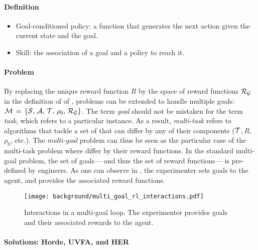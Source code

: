 \begin{tcolorbox}
\small
\paragraph{Definition}
\begin{itemize}
    \item \gls{Goal-conditioned policy}: a function that generates the next action given the current
state and the goal.
	\item \gls{Skill}:  the association of a goal and a policy to reach it.
\end{itemize}
\end{tcolorbox}

\paragraph{Problem}

By replacing the unique reward function $R$ by the space of reward functions $\mathcal{R}_{\mathcal{G}}$ in the definition of \mdp of , \rl problems can be extended to handle multiple goals: $\mathcal{M}\,=\,\{\mathcal{S},\,\mathcal{A},\,\mathcal{T},\,\rho_0,\,\mathcal{R}_{\mathcal{G}}\}$. The term \textit{goal} should not be mistaken for the term \textit{task}, which refers to a particular \mdp instance. As a result, \textit{multi-task} \rl refers to \rl algorithms that tackle a set of \mdps that can differ by any of their components (\eg $\mathcal{T}$,\,$R$,\,$\rho_0$, etc.). The \textit{multi-goal} \rl problem can thus be seen as the particular case of the multi-task \rl problem where \mdps differ by their reward functions. In the standard multi-goal \rl problem, the set of goals\,---\,and thus the set of reward functions\,---\,is pre-defined by engineers. As one can observe in , the experimenter sets goals to the agent, and provides the associated reward functions. 


\begin{figure}[!h]
\centering
\texttt{[image: background/multi\_goal\_rl\_interactions.pdf]}	
\caption{Interactions in a multi-goal \rl loop. The experimenter provides goals and their associated rewards to the agent.}
\label{fig:mg_rl_interactions}
\end{figure}


\paragraph{Solutions: Horde, UVFA, and HER}

